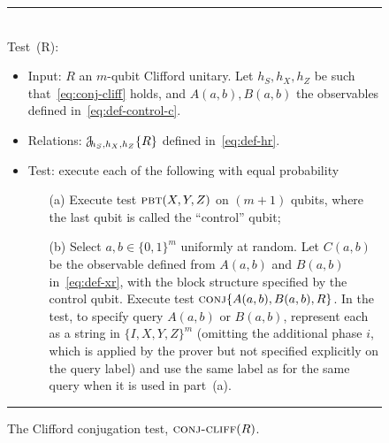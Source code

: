 \begin{figure}[H]
\rule[1ex]{\textwidth}{0.5pt}\\
Test~\conjc(R): 
\begin{itemize}
    \item Input: $R$ an $m$-qubit Clifford unitary. 	Let $h_S,h_X,h_Z$ be such that~\eqref{eq:conj-cliff} holds, and $A(a,b),B(a,b)$ the observables defined in~\eqref{eq:def-control-c}. 
    \item Relations: $\mathcal{J}\!_{h_S,h_X,h_Z}\{R\}$ defined in~\eqref{eq:def-hr}. 
    \item Test: execute each of the following with equal probability
\begin{enumerate}
\item[(a)] Execute test $\textsc{pbt}(X,Y,Z)$ on $(m+1)$ qubits, where the last qubit is called the ``control'' qubit;
\item[(b)] Select $a,b\in\{0,1\}^m$ uniformly at random. Let $C(a,b)$ be the observable defined from $A(a,b)$ and $B(a,b)$ in~\eqref{eq:def-xr}, with the block structure specified by the control qubit. Execute test $\textsc{conj}\{A(a,b),B(a,b),R\}$. In the test, to specify query $A(a,b)$ or $B(a,b)$, represent each as a string in $\{I,X,Y,Z\}^m$ (omitting the additional phase $i$, which is applied by the prover but not specified explicitly on the query label) and use the same label as for the same query when it is used in part~(a).
\end{enumerate}
\end{itemize}
\rule[2ex]{\textwidth}{0.5pt}\vspace{-0.5cm}
\caption{The Clifford conjugation test, $\textsc{conj-cliff}(R)$.}
\label{fig:conjugation-test-2}
\end{figure}



